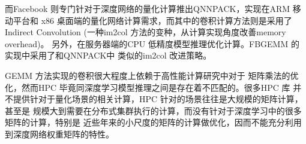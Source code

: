 而Facebook 则专门针对于深度网络的量化计算推出QNNPACK，实现在ARM 移动平台和
x86 桌面端的量化网络计算需求，而其中的卷积计算方法则是采用了 Indirect Convolution
\cite{Dukhan2019TheIC}(一种im2col 方法的变种，从计算实现角度改善memory overhead)。
另外，在服务器端的CPU 低精度模型推理优化计算。FBGEMM 的实现中采用了和QNNPACK中
类似的im2col 改进策略。

GEMM 方法实现的卷积很大程度上依赖于高性能计算研究中对于
矩阵乘法的优化，然而HPC 毕竟同深度学习模型推理之间是存在着不匹配的。很多HPC 库
并不提供针对于量化场景的相关计算，HPC 针对的场景往往是大规模的矩阵计算，甚至是
规模大到需要在分布式集群执行的计算，而没有针对于深度学习中的很多矩阵的计算，特别是
近些年来的小尺度的矩阵的计算做优化，因而不能充分利用到深度网络权重矩阵的特性。

